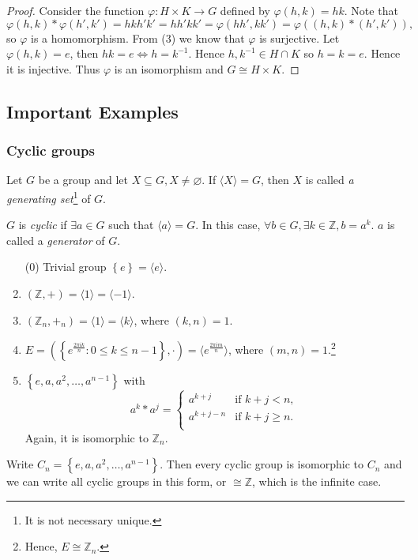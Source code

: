 \documentclass[a4paper]{article}
\begin{document}
\begin{proof}
  Consider the function $ \varphi: H\times K \to G $ defined by $
  \varphi(h,k)=hk $. Note that
  \[
    \varphi(h,k) * \varphi(h',k') =
    hkh'k'=hh'kk'=\varphi(hh',kk')=\varphi((h,k)*(h',k'))
  ,\]
  so $ \varphi $ is a homomorphism. From (3) we know that $ \varphi $
  is surjective. Let $ \varphi(h,k)=e $, then $ hk=e \Leftrightarrow
  h=k^{-1} $. Hence $ h,k^{-1}\in H \cap K $ so $ h=k=e $. Hence it
  is injective. Thus $\varphi$ is an isomorphism and $ G \cong H \times K $.
\end{proof}
\subsection{Important Examples}
\subsubsection{Cyclic groups}
\begin{definition}
  Let $G$ be a group and let $ X \subseteq G, X\neq \varnothing $. If
  $ \langle X \rangle =G $, then $X$ is called \textit{a generating
  set}\footnote{It is not necessary unique.} of $G$.

  $G$ is \textit{cyclic} if $\exists a\in G$ such that $ \langle a
  \rangle =G $. In this case, $ \forall b\in G, \exists k\in
  \mathbb{Z} , b=a^k $. $a$ is called a \textit{generator} of $G$.
\end{definition}
\begin{example}
  \begin{enumerate}[(1)]
    \item[(0)] Trivial group $ \left\{ e\right\}=\langle e \rangle  $.
    \item $ (\mathbb{Z} ,+)=\langle 1 \rangle =\langle -1 \rangle  $.
    \item $ (\mathbb{Z}_n, +_n)=\langle 1 \rangle =\langle k \rangle
      $, where $(k,n)=1$.
    \item $ E=\left(\left\{ e^{\frac{2\pi ik}{n}}:0\le k\le n-1
      \right\}, \cdot\right) =\langle e^{\frac{2\pi i m}{n}} \rangle
      $, where $(m,n)=1$.\footnote{Hence, $ E \cong \mathbb{Z}_n $.}
    \item $ \left\{ e,a,a^2,\dots, a^{n-1}\right\} $ with
      \[
        a^k * a^j =
        \begin{cases}
          a^{k+j} &\text{if } k+j<n,\\
          a^{k+j-n} &\text{if } k+j\ge n.\\
        \end{cases}
      \]
      Again, it is isomorphic to $ \mathbb{Z}_n $.
  \end{enumerate}
\end{example}
Write $ C_n = \left\{ e,a,a^2,\dots, a^{n-1}\right\} $. Then every
cyclic group is isomorphic to $C_n$ and we can write all cyclic
groups in this form, or $ \cong \mathbb{Z} $, which is the infinite case.
\end{document}
